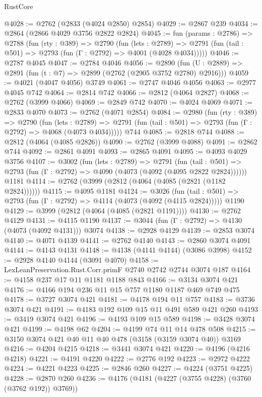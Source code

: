 \begin{lexlean}{RustCore}
\begin{coremodule}
@4028 := @2762 (@2833 (@4024 @2850) @2854)
@4029 := @2867 @239
@4034 := @2864 (@2866 @4029 @3756 @2822 @2824)
@4045 := fun (params : @2786) =>
  @2788
    (fun (rty : @389) =>
    @2790
      (fun (lets : @2789) =>
      @2791 (fun (tail : @501) => @2793 (fun (Γ : @2792) => @4001 (@4028 @4034)))))
@4046 := @2787 @4045
@4047 := @2784 @4046
@4056 := @2890 (fun (U : @2889) => @2891 (fun (t : @7) => @2899 (@2762 (@2905 @3752 @2780) @2916)))
@4059 := @4021 (@4047 @4056) @3749
@4061 := @2747 @4046 @4056
@4063 := @2977 @4045 @742
@4064 := @2814 @742
@4066 := @2812 (@4064 @2827)
@4068 := @2762 (@3999 @4066)
@4069 := @2849 @742
@4070 := @4024 @4069
@4071 := @2833 @4070
@4073 := @2762 (@4071 @2854)
@4084 := @2980
    (fun (rty : @389) =>
    @2790
      (fun (lets : @2789) =>
      @2791 (fun (tail : @501) => @2793 (fun (Γ : @2792) => @4068 (@4073 @4034)))))
    @744
@4085 := @2818 @744
@4088 := @2812 (@4064 (@4085 @2826))
@4090 := @2762 (@3999 @4088)
@4091 := @2862 @744
@4092 := @2861 @4091
@4093 := @2865 @4091
@4095 := @4093 @4029 @3756
@4107 := @3002
    (fun (lets : @2789) =>
    @2791
      (fun (tail : @501) => @2793 (fun (Γ : @2792) => @4090 (@4073 (@4092 (@4095 @2822 @2824))))))
    @1181
@4114 := @2762 (@3999 (@2812 (@4064 (@4085 (@2821 (@1182 @2824))))))
@4115 := @4095 @1181
@4124 := @3026
    (fun (tail : @501) => @2793 (fun (Γ : @2792) => @4114 (@4073 (@4092 (@4115 @2824)))))
    @1190
@4129 := @3999 (@2812 (@4064 (@4085 (@2821 @1191))))
@4130 := @2762 @4129
@4131 := @4115 @1190
@4137 := @3044 (fun (Γ : @2792) => @4130 (@4073 (@4092 @4131))) @3074
@4138 := @2928 @4129
@4139 := @2853 @3074
@4140 := @4071 @4139
@4141 := @2762 @4140
@4143 := @2860 @3074 @4091
@4144 := @4143 @4131
@4148 := @4138 (@4141 @4144) (@3086 @3998)
@4152 := @2928 @4140 @4144 (@3091 @4070)
@4158 := LexLeanPreservation.Rust.Corr.primF @2740 @2742 @2744 @3074 @187
@4164 := @4158 @237 @17 @11 @1181 @1188 @843
@4166 := @3134 @3074 @421
@4176 := @4166 @194 @236 @11 @15 @757 @1180 @1187 @469 @749 @475
@4178 := @3727 @3074 @421
@4181 := @4178 @194 @11 @757
@4183 := @3736 @3074 @421
@4191 := @4183 @192 @109 @15 @11 @491 @589 @421 @260
@4193 := @3419 @3074 @421
@4196 := @4193 @109 @15 @589
@4198 := @3428 @3074 @421
@4199 := @4198 @62
@4204 := @4199 @74 @11 @14 @478 @508
@4215 := @3150 @3074 @421 @40 @11 @40 @478 (@3158 (@3159 @3074 @40)) @3169
@4216 := @4204 @4215
@4218 := @3441 @3074 @421
@4220 := @4196 (@4216 @4218)
@4221 := @4191 @4220
@4222 := @2776 @192
@4223 := @2972 @4222
@4224 := @4221 @4223
@4225 := @2846 @260
@4227 := @4224 (@3751 @4225)
@4228 := @2870 @260
@4236 := @4176 (@4181 (@4227 (@3755 @4228) (@3760 (@3762 @192)) @3769))

\end{coremodule}
\end{lexlean}

